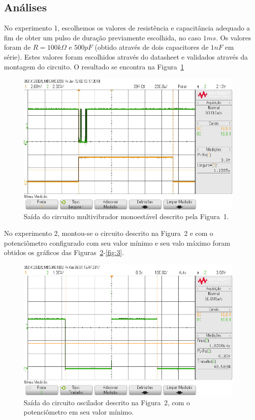 \documentclass[12pt,a4paper]{article}
\begin{document}
\subsection{Análises}
No experimento 1, escolhemos os valores de resistência  e capacitância adequado a fim de obter um pulso de duração previamente escolhida, no caso $1ms$. Os valores foram de $R=100k \Omega$ e $500 pF$ (obtido através de dois capacitores de $1 nF$ em série). Estes valores foram escolhidos através do datasheet e validados através da montagem do circuito.   O resultado se encontra na Figura~\ref{fig:1}
\begin{figure}[htpb]
  \centering
  \includegraphics[width=0.8\linewidth]{img/exp1.jpg}
  \caption{Saída do circuito multivibrador monoestável descrito pela Figura~1.}
  \label{fig:1}
\end{figure}

No experimento 2, montou-se o circuito descrito na Figura~2 e com o potenciômetro configurado com seu valor mínimo e seu valo máximo foram obtidos os gráficos das Figuras~\ref{fig:2}-\ref{fig:3}.
\begin{figure}[htpb]
  \centering
  \includegraphics[width=0.8\linewidth]{img/min.jpg}
  \caption{Saída do circuito oscilador descrito na Figura~2, com o potenciômetro em seu valor mínimo. }
  \label{fig:2}
\end{figure}
\end{document}
